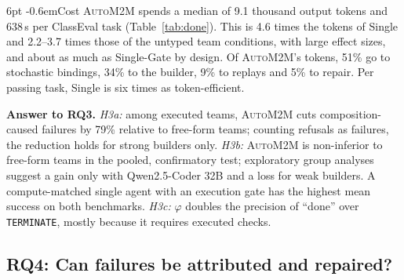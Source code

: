 \documentclass[pdflatex,sn-mathphys-num]{sn-jnl}
\makeatletter
\theoremstyle{thmstyleone}%
\theoremstyle{thmstyletwo}%
\theoremstyle{thmstylethree}%
\newcommand{\auto}{\textsc{AutoM2M}}
\newcommand{\code}[1]{\texttt{#1}}
\renewcommand\paragraph{\@startsection{paragraph}{4}{\z@}%
  {6pt \@plus 2pt \@minus 1pt}{-0.6em}{\normalfont\normalsize\bfseries}}
\makeatother
\begin{document}
\paragraph{Cost} \auto{} spends a median of 9.1 thousand output tokens and
638\,s per ClassEval task (Table~\ref{tab:done}). This is 4.6 times the tokens
of Single and 2.2--3.7 times those of the untyped team conditions, with large
effect sizes, and about as much as Single-Gate by design. Of \auto{}'s tokens,
51\% go to stochastic bindings, 34\% to the builder, 9\% to replays and 5\% to
repair. Per passing task, Single is six times as token-efficient.

\begin{tcolorbox}[enhanced, colback=modelbg, colframe=modelbar, boxrule=0.5pt, arc=1pt, left=6pt, right=6pt, top=3pt, bottom=3pt]
\small\textbf{Answer to RQ3.} \emph{H3a:} among executed teams, \auto{} cuts
composition-caused failures by 79\% relative to free-form teams; counting
refusals as failures, the reduction holds for strong builders only.
\emph{H3b:} \auto{} is non-inferior to free-form teams in the pooled,
confirmatory test; exploratory group analyses suggest a gain only with
Qwen2.5-Coder 32B and a loss for weak builders. A compute-matched single agent
with an execution gate has the highest mean success on both benchmarks.
\emph{H3c:} $\varphi$ doubles the precision of ``done'' over \code{TERMINATE},
mostly because it requires executed checks.
\end{tcolorbox}

\subsection{RQ4: Can failures be attributed and repaired?}\label{sec:res-rq4}
\end{document}
